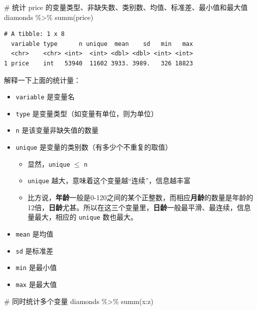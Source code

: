 \documentclass[
  letterpaper,
]{ctexbook}
\newenvironment{Shaded}{\begin{snugshade}}{\end{snugshade}}
\newcommand{\CommentTok}[1]{\textcolor[rgb]{0.37,0.37,0.37}{#1}}
\newcommand{\FunctionTok}[1]{\textcolor[rgb]{0.28,0.35,0.67}{#1}}
\newcommand{\NormalTok}[1]{\textcolor[rgb]{0.00,0.23,0.31}{#1}}
\newcommand{\SpecialCharTok}[1]{\textcolor[rgb]{0.37,0.37,0.37}{#1}}
\providecommand{\tightlist}{%
  \setlength{\itemsep}{0pt}\setlength{\parskip}{0pt}}\usepackage{longtable,booktabs,array}
\begin{document}
\begin{Shaded}
\begin{Highlighting}[]
\CommentTok{\# 统计 price 的变量类型、非缺失数、类别数、均值、标准差、最小值和最大值}
\NormalTok{diamonds }\SpecialCharTok{\%\textgreater{}\%}
  \FunctionTok{summ}\NormalTok{(price)}
\end{Highlighting}
\end{Shaded}

\begin{verbatim}
# A tibble: 1 x 8
  variable type      n unique  mean    sd   min   max
  <chr>    <chr> <int>  <int> <dbl> <dbl> <int> <int>
1 price    int   53940  11602 3933. 3989.   326 18823
\end{verbatim}

解释一下上面的统计量：

\begin{itemize}
\tightlist
\item
  \texttt{variable} 是变量名
\item
  \texttt{type} 是变量类型（如变量有单位，则为单位）
\item
  \texttt{n} 是该变量非缺失值的数量
\item
  \texttt{unique} 是变量的类别数（有多少个不重复的取值）

  \begin{itemize}
  \tightlist
  \item
    显然，\texttt{unique} \(\leq\) \texttt{n}
  \item
    \texttt{unique} 越大，意味着这个变量越``连续''，信息越丰富
  \item
    比方说，\textbf{年龄}一般是0-120之间的某个正整数，而相应\textbf{月龄}的数量是年龄的12倍，\textbf{日龄}尤甚。所以在这三个变量里，\textbf{日龄}一般最平滑、最连续，信息量最大，相应的
    \texttt{unique} 数也最大。
  \end{itemize}
\item
  \texttt{mean} 是均值
\item
  \texttt{sd} 是标准差
\item
  \texttt{min} 是最小值
\item
  \texttt{max} 是最大值
\end{itemize}

\begin{Shaded}
\begin{Highlighting}[]
\CommentTok{\# 同时统计多个变量}
\NormalTok{diamonds }\SpecialCharTok{\%\textgreater{}\%}
  \FunctionTok{summ}\NormalTok{(x}\SpecialCharTok{:}\NormalTok{z)}
\end{Highlighting}
\end{Shaded}
\end{document}
